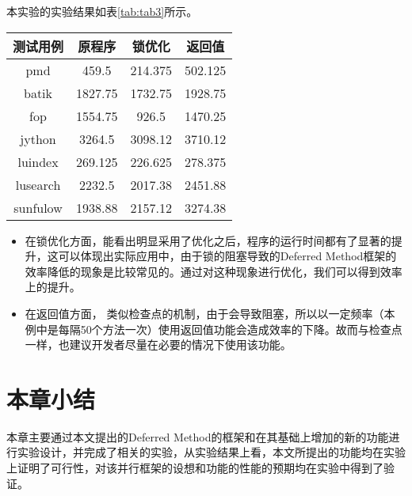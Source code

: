本实验的实验结果如表\ref{tab:tab3}所示。

\begin{table}[htbp]
	\centering
	\begin{tabular}{c|c|c|c}
		\hline
		测试用例 & 原程序 & 锁优化 & 返回值 \\
		\hline
		pmd & 459.5 & 214.375 & 502.125 \\
		\hline
		batik & 1827.75 & 1732.75 & 1928.75 \\
		\hline
		fop & 1554.75 & 926.5 & 1470.25 \\
		\hline
		jython & 3264.5 & 3098.12 & 3710.12 \\
		\hline
		luindex & 269.125 & 226.625 & 278.375 \\
		\hline
		lusearch & 2232.5 & 2017.38 & 2451.88 \\
		\hline
		sunfulow & 1938.88 & 2157.12 & 3274.38 \\
		\hline
	\end{tabular}
\end{table}

\begin{itemize}
	\item 在锁优化方面，能看出明显采用了优化之后，程序的运行时间都有了显著的提升，这可以体现出实际应用中，由于锁的阻塞导致的Deferred Method框架的效率降低的现象是比较常见的。通过对这种现象进行优化，我们可以得到效率上的提升。
	\item 在返回值方面， 类似检查点的机制，由于会导致阻塞，所以以一定频率（本例中是每隔50个方法一次）使用返回值功能会造成效率的下降。故而与检查点一样，也建议开发者尽量在必要的情况下使用该功能。
\end{itemize}

\section{本章小结}

本章主要通过本文提出的Deferred Method的框架和在其基础上增加的新的功能进行实验设计，并完成了相关的实验，从实验结果上看，本文所提出的功能均在实验上证明了可行性，对该并行框架的设想和功能的性能的预期均在实验中得到了验证。
